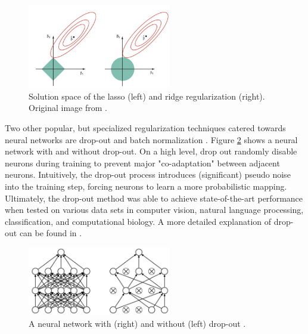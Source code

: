 \begin{figure}[H]
    \centering
    \includegraphics[width=0.56\textwidth]{images/ch1/L1_vs_L2.JPG}
    \caption{Solution space of the lasso (left) and ridge regularization (right). Original image from \cite{generic_stats}.}
    \label{fig:01l1vsl2}
\end{figure}   

Two other popular, but specialized regularization techniques catered towards neural networks are drop-out and batch normalization \cite{dropout, batch_norm}. Figure \ref{fig:01dropout} shows a neural network with and without drop-out. On a high level, drop out randomly disable neurons during training to prevent major "co-adaptation" between adjacent neurons. Intuitively, the drop-out process introduces (significant) pseudo noise into the training step, forcing neurons to learn a more probabilistic mapping. Ultimately, the drop-out method was able to achieve state-of-the-art performance when tested on various data sets in computer vision, natural language processing, classification, and computational biology. A more detailed explanation of drop-out can be found in \cite{dropout}.   

\begin{figure}[H]
    \centering
    \includegraphics[width=0.56\textwidth]{images/ch1/dropout.jpg}
    \caption{A neural network with (right) and without (left) drop-out \cite{dropout}.}
    \label{fig:01dropout}
\end{figure}  

